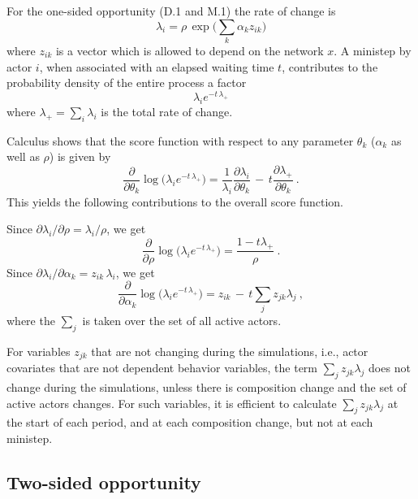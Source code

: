 \documentclass[a4paper,12pt,fleqn]{article}
\begin{document}
For the one-sided opportunity (D.1 and M.1) the rate of change is
\begin{equation}
\lambda_i = \rho\,\exp\Big(\sum_k \alpha_k z_{ik}\Big)  \label{eq:lambda1}
\end{equation}
where $z_{ik}$ is a vector which is allowed to depend on the network $x$.
A ministep by actor $i$,
when associated with an elapsed waiting time $t$, contributes
to the probability density of the entire process a factor
\[
\lambda_i e^{-t\,\lambda_+}
\]
where $\lambda_+ = \sum_i \lambda_i$ is the total rate of change.

Calculus shows that the score function with respect to any parameter
$\theta_k$ ($\alpha_k$ as well as $\rho$) is given by
\begin{equation}
    \frac{\partial }{\partial \theta_k} \log \Big( \lambda_i e^{-t\,\lambda_+} \Big)
  = \frac{1}{\lambda_i} \frac{\partial \lambda_i}{\partial \theta_k} \, - \,
  t  \frac{\partial \lambda_+}{\partial \theta_k} \ .
\nonumber %
\end{equation}
This yields the following contributions to the overall score function.

Since $\partial \lambda_i/\partial \rho = \lambda_i/\rho$, we get
\begin{equation}
    \frac{\partial }{\partial \rho} \log \Big( \lambda_i e^{-t\,\lambda_+} \Big)
  = \frac{1 - t \lambda_+}{\rho}  \ .   \label{eq:scorelambda1r}
\end{equation}
Since $\partial \lambda_i/\partial \alpha_k = z_{ik}\,\lambda_i$, we get
\begin{equation}
    \frac{\partial }{\partial \alpha_k} \log \Big( \lambda_i e^{-t\,\lambda_+} \Big)
  = z_{ik} \,-\, t \sum_{j} z_{jk}\lambda_j  \ ,   \label{eq:scorelambda1ak}
\end{equation}
where the $\sum_j$ is taken over the set of all active actors.

For variables $z_{jk}$ that are not changing during the simulations,
i.e., actor covariates that are not dependent behavior variables,
the term $\sum_{j} z_{jk}\lambda_j $
does not change during the simulations, unless there is composition change
and the set of active actors changes.
For such variables, it is efficient to calculate $\sum_{j} z_{jk}\lambda_j $
at the start of each period, and at each composition change,
but not at each ministep.



\subsection{Two-sided opportunity}
\label{S_14.2}
\end{document}
